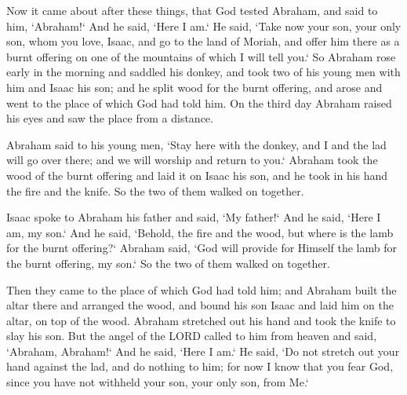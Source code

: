 \begin{scripture}[Genesis 22:1-19]
    Now it came about after these things, that God tested Abraham, 
     and said to him, `Abraham!` And he said, `Here I am.`
    He said, `Take now your son, your only son, whom you love, Isaac, and go to the land of Moriah, and offer him there as a burnt offering on one of the mountains of which I will tell you.`
    So Abraham rose early in the morning and saddled his donkey, and took two of his young men with him and Isaac his son; and he split wood for the burnt offering, 
    and arose and went to the place of which God had told him. 
    On the third day Abraham raised his eyes and saw the place from a distance.

    \vspace{2\baselineskip}

    Abraham said to his young men, 
    `Stay here with the donkey, and I and the lad will go over there; and we will worship and return to you.`
    Abraham took the wood of the burnt offering and laid it on Isaac his son,  
    and he took in his hand the fire and the knife. So the two of them walked on together.

    \vspace{2\baselineskip}

    Isaac spoke to Abraham his father and said, 
    `My father!` And he said, `Here I am, my son.` And he said, `Behold, the fire and the wood, but where is the lamb for the burnt offering?`
    Abraham said, `God will provide for Himself the lamb for the burnt offering, my son.` So the two of them walked on together. 

    \vspace{2\baselineskip}

    Then they came to the place of which God had told him; and Abraham built the altar there and arranged the wood, and bound his son Isaac and laid him on the altar, on top of the wood.
    Abraham stretched out his hand and took the knife to slay his son.
    But the angel of the LORD called to him from heaven and said, `Abraham, Abraham!` And he said, `Here I am.`
    He said, `Do not stretch out your hand against the lad, and do nothing to him; for now I know that you fear God, since you have not withheld your son, your only son, from Me.`


\end{scripture}
